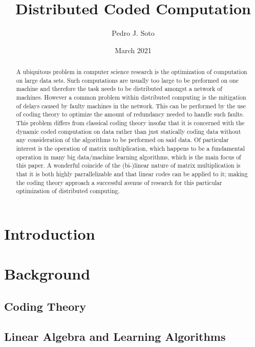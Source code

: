 \documentclass{report}
\title{Distributed Coded Computation}
\author{Pedro J. Soto}
\date{March 2021}
\begin{document}
\maketitle


\tableofcontents

\begin{abstract}
A ubiquitous problem in computer science research is the optimization of computation on large data sets. Such computations are usually too large to be preformed on one machine and therefore the task needs to be distributed amongst a network of machines. However a common problem within distributed computing is the mitigation of delays caused by faulty machines in the network. This can be performed by the use of coding theory to optimize the amount of redundancy needed to handle such faults.  This problem differs from classical coding theory insofar that it is concerned with the dynamic coded computation on data rather than just statically coding data without any consideration of the algorithms to be performed on said data. Of particular interest is the operation of matrix multiplication, which happens to be a fundamental operation in many big data/machine learning algorithms, which is the main focus of this paper. A wonderful coincide of the (bi-)linear nature of matrix multiplication is that it is both highly parrallelizable and that linear codes can be applied to it; making the coding theory approach a successful avenue of research for this particular optimization of distributed computing. 
\end{abstract}

\section{Introduction}

\section{Background}

\subsection{Coding Theory}

\subsection{Linear Algebra and Learning Algorithms}
\end{document}

